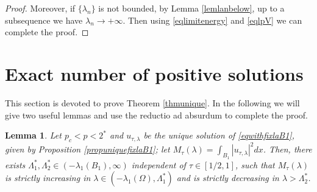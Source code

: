 \documentclass[10pt,a4paper]{article}
\newtheorem{lemma}[theorem]{Lemma}
\theoremstyle{definition} \theoremstyle{remark}
\numberwithin{equation}{section}
\newcommand{\la}{\lambda}
\newcommand{\La}{\Lambda}
\begin{document}
\begin{proof}
	Moreover, if $\{\la_n\}$ is not bounded, by Lemma \ref{lemlanbelow}, up to a subsequence we have $\la_n \to +\infty$. Then using \eqref{eqlimitenergy} and \eqref{eqlpV} we can complete the proof.
\end{proof}

\section{Exact number of positive solutions} \label{secpositionsolu}

This section is devoted to prove Theorem \ref{thmunique}. In the following we will give two useful lemmas and use the reductio ad absurdum to complete the proof.

\begin{lemma} \label{lemMmu}
	Let $p_c < p < 2^*$ and $u_{\tau,\la}$ be the unique solution of \eqref{eqwithfixlaB1}, given by Proposition \ref{propuniquefixlaB1}; let $M_\tau(\la) = \int_{B_1} |u_{\tau,\la}|^2dx$. Then, there exists $\La_1^*, \La_2^* \in (-\la_1(B_1),\infty)$ independent of $\tau \in [1/2,1]$, such that $M_\tau(\la)$ is strictly increasing in $\la \in (-\la_1(\Omega), \La_1^*)$ and is strictly decreasing in $\la > \La_2^*$.
\end{lemma}
\end{document}

